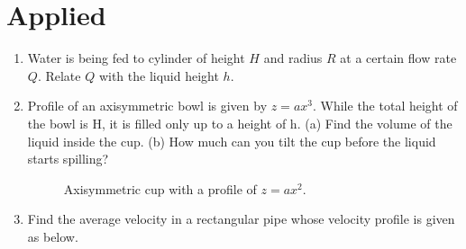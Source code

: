 \documentclass[a4paper,12pt]{article}
\begin{document}
\section*{\centering Applied}
\begin{enumerate}
  \item Water is being fed to cylinder of height $H$ and radius $R$ at a certain flow rate $Q$. Relate $Q$ with the liquid height $h$.
  
  \item Profile of an axisymmetric bowl is given by $z = ax^3$. While the total height of the bowl is H, it is filled only up to a height of h. (a) Find the volume of the liquid inside the cup. (b) How much can you tilt the cup before the liquid starts spilling?
  
 \begin{figure}[h]
 \begin{center}
\end{center}
 \caption{Axisymmetric cup with a profile of $z=ax^2$.}
 \end{figure}

\item Find the average velocity in a rectangular pipe whose velocity profile is given as below.
  

\end{enumerate}
\end{document}
